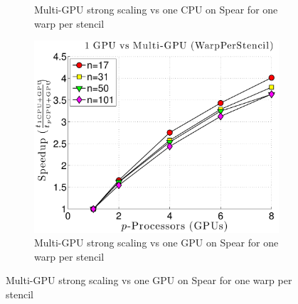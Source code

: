 \begin{figure}
\begin{subfigure}[t]{0.425\textwidth}
\caption{Multi-GPU strong scaling vs one CPU on Spear for one warp per stencil}
\label{fig:alltoall_multigpu_vs_cpu_scaling}
\end{subfigure} 
\begin{subfigure}[t]{0.425\textwidth}
\centering
\includegraphics[width=1.0\textwidth]{../figures/spear_results/vortex/speedup_1GPU_vs_NGPU_WarpPerStencil-eps-converted-to.pdf}
\caption{Multi-GPU strong scaling vs one GPU on Spear for one warp per stencil}
\label{fig:alltoall_multigpu_vs_gpu_scaling}
\end{subfigure} 
\end{figure} 


